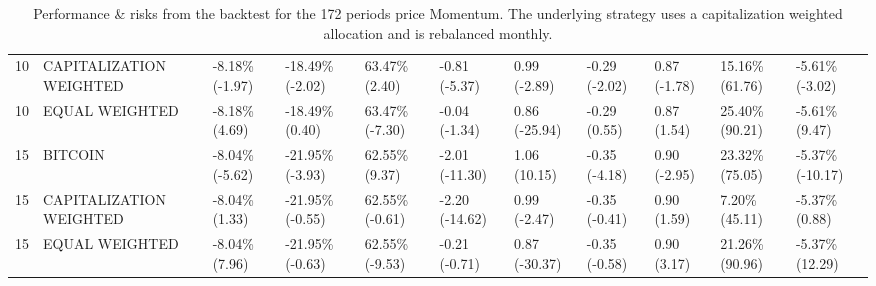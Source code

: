 \documentclass{article}
\begin{document}
\begin{landscape}
\begin{table}[H]
\begin{tabular}{p{0.4cm}|p{3cm}|p{1.65cm}|p{1.65cm}|p{1.65cm}|p{1.65cm}|p{1.65cm}|p{1.65cm}|p{1.65cm}|p{1.65cm}|p{1.65cm}}
10&CAPITALIZATION WEIGHTED&-8.18\% (-1.97)&-18.49\% (-2.02)&63.47\% (2.40)&-0.81 (-5.37)&0.99 (-2.89)&-0.29 (-2.02)&0.87 (-1.78)&15.16\% (61.76)&-5.61\% (-3.02)
\\ 
10&EQUAL WEIGHTED&-8.18\% (4.69)&-18.49\% (0.40)&63.47\% (-7.30)&-0.04 (-1.34)&0.86 (-25.94)&-0.29 (0.55)&0.87 (1.54)&25.40\% (90.21)&-5.61\% (9.47)
\\ 
15&BITCOIN&-8.04\% (-5.62)&-21.95\% (-3.93)&62.55\% (9.37)&-2.01 (-11.30)&1.06 (10.15)&-0.35 (-4.18)&0.90 (-2.95)&23.32\% (75.05)&-5.37\% (-10.17)
\\ 
15&CAPITALIZATION WEIGHTED&-8.04\% (1.33)&-21.95\% (-0.55)&62.55\% (-0.61)&-2.20 (-14.62)&0.99 (-2.47)&-0.35 (-0.41)&0.90 (1.59)&7.20\% (45.11)&-5.37\% (0.88)
\\ 
15&EQUAL WEIGHTED&-8.04\% (7.96)&-21.95\% (-0.63)&62.55\% (-9.53)&-0.21 (-0.71)&0.87 (-30.37)&-0.35 (-0.58)&0.90 (3.17)&21.26\% (90.96)&-5.37\% (12.29)
\\ 
\bottomrule
  \end{tabular}
  \label{tab:mom172capiweight}
   \caption{Performance \& risks from the backtest for the 172 periods price Momentum. The underlying strategy uses a capitalization weighted allocation and is rebalanced monthly.}
\end{table}
\end{landscape}
\end{document}
